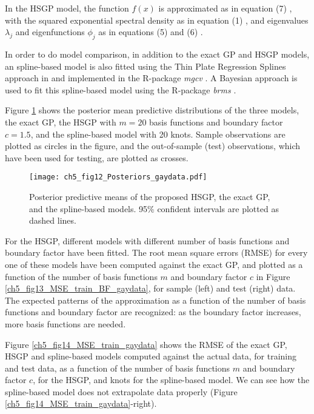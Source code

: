 \documentclass[onecolumn,a4paper,11pt]{article}
\begin{document}
In the HSGP model, the function $f(x)$ is approximated as in equation (7)%
, with the squared exponential spectral density as in equation (1)%
, and eigenvalues $\lambda_j$  and eigenfunctions $\phi_j$ as in equations (5) %
and (6)%
. 

In order to do model comparison, in addition to the exact GP and HSGP models, an spline-based model is also fitted using the Thin Plate Regression Splines approach in \cite{wood2003thin} and implemented in the R-package \textit{mgcv} \citep{wood2011mgcv}. A Bayesian approach is used to fit this spline-based model using the R-package \textit{brms} \citep{burkner2017brms}.

Figure \ref{ch5_fig12_Posteriors_gaydata} shows the posterior mean predictive distributions of the three models, the exact GP, the HSGP with $m=20$ basis functions and boundary factor $c=1.5$, and the spline-based model with 20 knots. Sample observations are plotted as circles in the figure, and the out-of-sample (test) observations, which have been used for testing, are plotted as crosses.

\begin{figure}
\centering
\texttt{[image: ch5\_fig12\_Posteriors\_gaydata.pdf]}
\caption{Posterior predictive means of the proposed HSGP, the exact GP, and the spline-based models. 95\% confident intervals are plotted as dashed lines.}
  \label{ch5_fig12_Posteriors_gaydata}
\end{figure}

For the HSGP, different models with different number of basis functions and boundary factor have been fitted. The root mean square errors (RMSE) for every one of these models have been computed against the exact GP, and plotted as a function of the number of basis functions $m$ and boundary factor $c$ in Figure \ref{ch5_fig13_MSE_train_BF_gaydata}, for sample (left) and test (right) data. The expected patterns of the approximation as a function of the number of basis functions and boundary factor are recognized: as the boundary factor increases, more basis functions are needed.

Figure \ref{ch5_fig14_MSE_train_gaydata} shows the RMSE of the exact GP, HSGP and spline-based models computed against the actual data, for training and test data, as a function of the number of basis functions $m$ and boundary factor $c$, for the HSGP, and knots for the spline-based model. We can see how the spline-based model does not extrapolate data properly (Figure \ref{ch5_fig14_MSE_train_gaydata}-right). 
\end{document}
